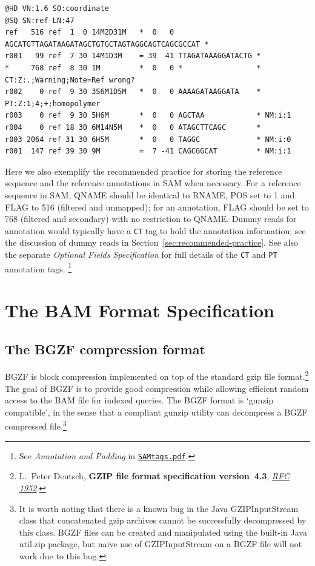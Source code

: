 \documentclass[10pt]{article}
\begin{document}
\begin{framed}\small
\begin{verbatim}
@HD VN:1.6 SO:coordinate
@SQ SN:ref LN:47
ref   516 ref  1  0 14M2D31M   *  0   0 AGCATGTTAGATAAGATAGCTGTGCTAGTAGGCAGTCAGCGCCAT *
r001   99 ref  7 30 14M1D3M    = 39  41 TTAGATAAAGGATACTG *
*     768 ref  8 30 1M         *  0   0 *                 * CT:Z:.;Warning;Note=Ref wrong?
r002    0 ref  9 30 3S6M1D5M   *  0   0 AAAAGATAAGGATA    * PT:Z:1;4;+;homopolymer
r003    0 ref  9 30 5H6M       *  0   0 AGCTAA            * NM:i:1
r004    0 ref 18 30 6M14N5M    *  0   0 ATAGCTTCAGC       *
r003 2064 ref 31 30 6H5M       *  0   0 TAGGC             * NM:i:0
r001  147 ref 39 30 9M         =  7 -41 CAGCGGCAT         * NM:i:1
\end{verbatim}
\end{framed}

Here we also exemplify the recommended practice for storing the reference
sequence and the reference annotations in SAM when necessary. For a reference
sequence in SAM, {\sf QNAME} should be identical to {\sf RNAME}, {\sf POS} set
to 1 and {\sf FLAG} to 516 (filtered and unmapped); for an annotation, {\sf
FLAG} should be set to 768 (filtered and secondary) with no restriction to {\sf
QNAME}.
Dummy reads for annotation would typically have a {\tt CT} tag to hold the annotation information; see the discussion of dummy reads in Section~\ref{sec:recommended-practice}.
See also the separate {\sl Optional Fields Specification} for full details of the {\tt CT} and {\tt PT} annotation tags.%
\footnote{See \emph{Annotation and Padding} in \href{http://samtools.github.io/hts-specs/SAMtags.pdf}{\tt SAMtags.pdf}.}

\pagebreak

\section{The BAM Format Specification}

\subsection{The BGZF compression format}

BGZF is block compression implemented on top of the standard gzip file
format.\footnote{L.~Peter Deutsch, {\bf GZIP file format specification
version~4.3}, \href{http://tools.ietf.org/html/rfc1952}{\sl RFC 1952}.}
The goal of BGZF is to provide good compression while allowing
efficient random access to the BAM file for indexed queries. The BGZF
format is `gunzip compatible', in the sense that a compliant gunzip
utility can decompress a BGZF compressed file.\footnote{It is worth noting that there is a known bug in the Java {\sf
  GZIPInputStream} class that concatenated gzip archives cannot be
successfully decompressed by this class. BGZF files can be created and
manipulated using the built-in Java {\sf util.zip} package, but naive
use of {\sf GZIPInputStream} on a BGZF file will not work due to this
bug.}
\end{document}
